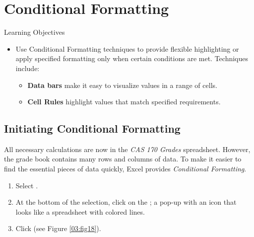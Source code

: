 \section{Conditional Formatting}

\begin{center}
	\begin{objbox}{Learning Objectives}
		\begin{itemize}
			\setlength{\itemsep}{0pt}
			\setlength{\parskip}{0pt}
			\setlength{\parsep}{0pt}

			\item Use Conditional Formatting techniques to provide flexible highlighting or apply specified formatting only when certain conditions are met. Techniques include:

			\begin{itemize}			
				\item \textbf{Data bars} make it easy to visualize values in a range of cells.
				\item \textbf{Cell Rules} highlight values that match specified requirements.
			\end{itemize}

		\end{itemize}
	\end{objbox}
\end{center}

\subsection{Initiating Conditional Formatting}

All necessary calculations are now in the \textit{CAS 170 Grades} spreadsheet. However, the grade book contains many rows and columns of data. To make it easier to find the essential pieces of data quickly, Excel provides \textit{Conditional Formatting}.

\begin{enumbox}
	\begin{enumerate}
		\item Select .
		\item At the bottom of the selection, click on the ; a pop-up with an icon that looks like a spreadsheet with colored lines.
		\item Click  (see Figure \ref{03:fig18}).
	\end{enumerate}
\end{enumbox}
	

